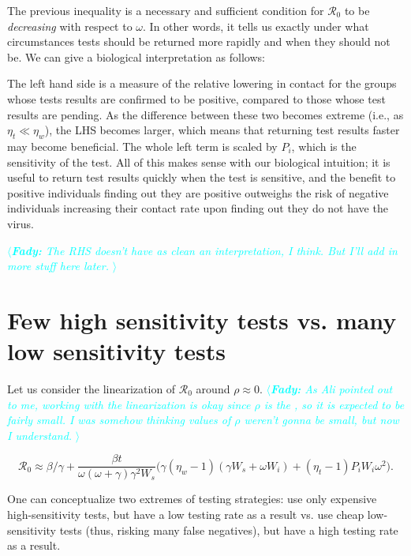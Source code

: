 \documentclass{article}
\newcommand{\fady}[1]{\textcolor{cyan}{$\langle${\slshape{\bfseries Fady:} #1 }$\rangle$}}
\newcommand{\Rnum}{\mathcal{R}_0}
\begin{document}
The previous inequality is a necessary and sufficient condition for $\Rnum$ to be \emph{decreasing} with respect to $\omega$. In other words, it tells us exactly under what circumstances tests should be returned more rapidly and when they should not be. We can give a biological interpretation as follows:

The left hand side is a measure of the relative lowering in contact for the groups whose tests results are confirmed to be positive, compared to those whose test results are pending. As the difference between these two becomes extreme (i.e., as $\eta_t \ll \eta_{w}$), the LHS becomes larger, which means that returning test results faster may become beneficial. The whole left term is scaled by $P_i$, which is the sensitivity of the test. All of this makes sense with our biological intuition; it is useful to return test results quickly when the test is sensitive, and the benefit to positive individuals finding out they are positive outweighs the risk of negative individuals increasing their contact rate upon finding out they do not have the virus.

\fady{The RHS doesn't have as clean an interpretation, I think. But I'll add in more stuff here later.}

\section{Few high sensitivity tests vs. many low sensitivity tests}

Let us consider the linearization of $\Rnum$ around $\rho \approx 0$. \fady{As Ali pointed out to me, working with the linearization is okay since $\rho$ is the \text{daily per capita testing rate}, so it is expected to be fairly small. I was somehow thinking values of $\rho$ weren't gonna be small, but now I understand.}

\begin{equation}
\Rnum \approx \beta/\gamma + \frac{\beta t}{\omega (\omega+\gamma) \gamma^2 W_s} \Big(\gamma(\eta_w-1)(\gamma W_s+\omega W_i) + (\eta_t -1)P_iW_i \omega^2 \Big). 
\end{equation}

One can conceptualize two extremes of testing strategies: use only expensive high-sensitivity tests, but have a low testing rate as a result vs. use cheap low-sensitivity tests (thus, risking many false negatives), but have a high testing rate as a result. 
\end{document}
